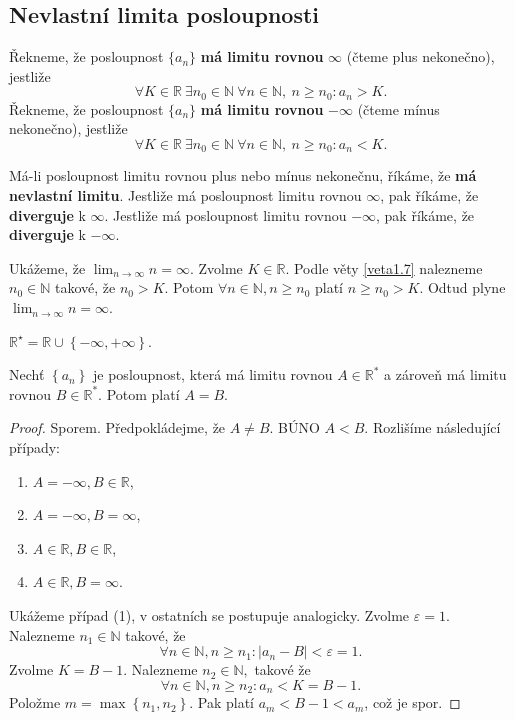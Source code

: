 \subsection{Nevlastní limita posloupnosti}

\begin{definice}
Řekneme, že posloupnost $\{a_n\}$ \textbf{má limitu rovnou} $\infty$ (čteme plus nekonečno),
jestliže
\[
\forall K \in \mathbb{R} \ \exists n_0 \in \mathbb{N}
\ \forall n \in \mathbb{N}, \ n \ge n_0 : a_n > K.
\]
Řekneme, že posloupnost $\{a_n\}$ \textbf{má limitu rovnou} $-\infty$ (čteme mínus nekonečno),
jestliže
\[
\forall K \in \mathbb{R} \ \exists n_0 \in \mathbb{N}
\ \forall n \in \mathbb{N}, \ n \ge n_0 : a_n < K.
\]
\par Má-li posloupnost limitu rovnou plus nebo mínus nekonečnu, říkáme, že \textbf{má nevlastní
limitu}. Jestliže má posloupnost limitu rovnou $\infty$, pak říkáme, že \textbf{diverguje} k
$\infty$. Jestliže má posloupnost limitu rovnou $-\infty$, pak říkáme, že \textbf{diverguje}
k $-\infty$.
\end{definice}

\begin{priklad}
	Ukážeme, že $\lim_{n \to \infty} n= \infty$. Zvolme $K\in \mathbb R $. Podle věty \ref{veta1.7} nalezneme $n_0\in \mathbb N $
	takové, že $n_0 > K$. Potom $\forall n \in \mathbb N , n \geq n_0$ platí $n\geq n_0 >K$. Odtud plyne
	$\lim_{n \to \infty} n=\infty$.
\end{priklad}

\begin{oznaceni}
	$\mathbb R ^\star=\mathbb R \cup \left \{ -\infty, +\infty \right \} $.
\end{oznaceni}

\begin{veta}\label{veta2.10}
Nechť $\left \{ a_n \right \} $ je posloupnost, která má limitu rovnou
$A\in \mathbb R ^*$ a zároveň má limitu rovnou $B\in \mathbb R ^*$. Potom platí $A= B$.
\end{veta}

\begin{proof}
	Sporem. Předpokládejme, že $A\ne B$. BÚNO $A<B$. Rozlišíme následující případy:
	\begin{enumerate}[(1)]
		\item $A=-\infty, B \in \mathbb R $,
		\item $A = -\infty, B = \infty$,
		\item $A\in \mathbb R , B\in \mathbb R $,
		\item $A\in \mathbb R , B=\infty$.
\end{enumerate}
Ukážeme případ (1), v ostatních se postupuje analogicky. Zvolme $\varepsilon = 1$. Nalezneme $n_1\in \mathbb N $
takové, že
$$
    \forall n \in \mathbb N , n \geq n_1: |a_n - B| < \varepsilon = 1.
$$
Zvolme $K = B-1$. Nalezneme $n_2 \in \mathbb N ,$ takové že
$$
    \forall n \in \mathbb N , n\geq n_2: a_n < K = B-1.
$$
Položme $m = \max \left \{ n_1,n_2 \right \} $. Pak platí $a_m < B-1<a_m$, což je spor.
\end{proof}

